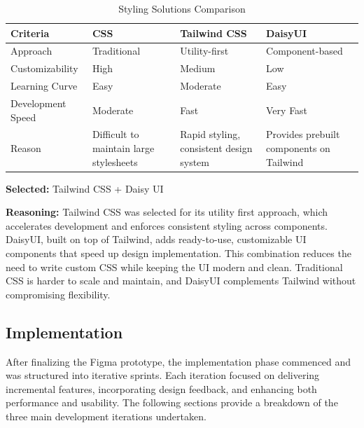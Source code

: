 \begin{table}[H]
\centering
\caption{Styling Solutions Comparison}
\begin{tabular}{|l|p{4cm}|p{4cm}|p{4cm}|}
\hline
\textbf{Criteria}       & \textbf{CSS}               & \textbf{Tailwind CSS}        & \textbf{DaisyUI}             \\
\hline
Approach                & Traditional                & Utility-first                & Component-based              \\
Customizability         & High                       & Medium                      & Low                         \\
Learning Curve          & Easy                       & Moderate                    & Easy                        \\
Development Speed       & Moderate                   & Fast                        & Very Fast                   \\
Reason                  & Difficult to maintain large stylesheets & Rapid styling, consistent design system & Provides prebuilt components on Tailwind \\
\hline
\end{tabular}
\label{tab:styling-solutions-comparison}
\end{table}

\textbf{Selected:} Tailwind CSS + Daisy UI \par
\textbf{Reasoning:} Tailwind CSS was selected for its utility first approach, which accelerates development and enforces consistent styling across components. DaisyUI, built on top of Tailwind, adds ready-to-use, customizable UI components that speed up design implementation. This combination reduces the need to write custom CSS while keeping the UI modern and clean. Traditional CSS is harder to scale and maintain, and DaisyUI complements Tailwind without compromising flexibility.

\subsection{Implementation}

After finalizing the Figma prototype, the implementation phase commenced and was structured into iterative sprints. Each iteration focused on delivering incremental features, incorporating design feedback, and enhancing both performance and usability. The following sections provide a breakdown of the three main development iterations undertaken.

